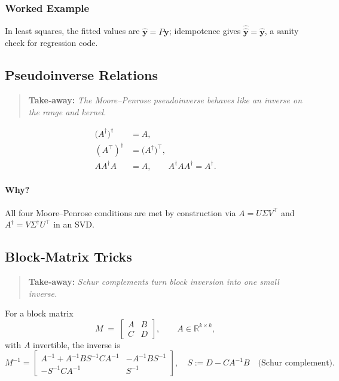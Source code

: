 \subsubsection*{Worked Example}
In least squares, the fitted values are $\hat{\mathbf y}=P\mathbf y$; idempotence gives
$\hat{\hat{\mathbf y}}=\hat{\mathbf y}$, a sanity check for regression code.

\subsection{Pseudoinverse Relations}
\begin{quote}
\textbf{Take‑away:} \emph{The Moore–Penrose pseudoinverse behaves like an inverse on the range and kernel.}
\end{quote}

\begin{align}
\bigl(A^\dagger\bigr)^\dagger &= A,\\[4pt]
(A^\top)^\dagger &= \bigl(A^\dagger\bigr)^\top,\\[4pt]
AA^\dagger A &= A,\qquad
A^\dagger A A^\dagger = A^\dagger.
\end{align}

\paragraph{Why?}
All four Moore–Penrose conditions are met by construction via $A=U\Sigma V^\top$
and $A^\dagger=V\Sigma^\dagger U^\top$ in an SVD.

\subsection{Block‑Matrix Tricks}
\begin{quote}
\textbf{Take‑away:} \emph{Schur complements turn block inversion into one small inverse.}
\end{quote}

For a block matrix
\[
M \;=\;
\begin{bmatrix}
A & B\\[4pt]
C & D
\end{bmatrix},\qquad
A\in\mathbb R^{k\times k},
\]
with $A$ invertible, the inverse is
\[
M^{-1} =
\begin{bmatrix}
A^{-1} + A^{-1}B S^{-1} C A^{-1} & -A^{-1} B S^{-1}\\[6pt]
- S^{-1} C A^{-1} & S^{-1}
\end{bmatrix},
\quad
S := D - C A^{-1} B
\quad\text{(Schur complement)}.
\]

